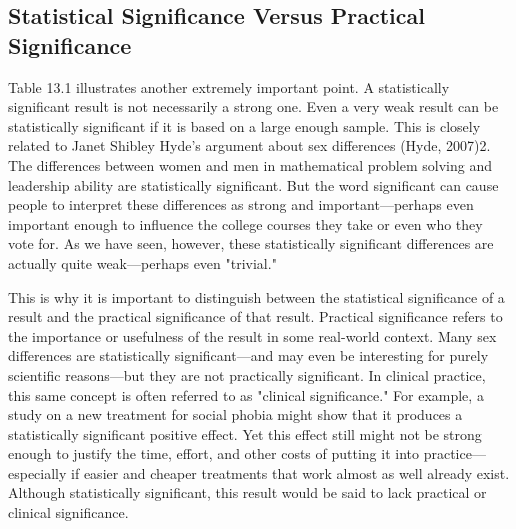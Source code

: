 \subsection{Statistical Significance Versus Practical Significance}


Table 13.1 illustrates another extremely important point. A statistically significant result is not necessarily a strong one. Even a very weak result can be statistically significant if it is based on a large enough sample. This is closely related to Janet Shibley Hyde's argument about sex differences (Hyde, 2007)2. The differences between women and men in mathematical problem solving and leadership ability are statistically significant. But the word significant can cause people to interpret these differences as strong and important---perhaps even important enough to influence the college courses they take or even who they vote for. As we have seen, however, these statistically significant differences are actually quite weak---perhaps even "trivial."


This is why it is important to distinguish between the statistical significance of a result and the practical significance of that result. Practical significance refers to the importance or usefulness of the result in some real-world context. Many sex differences are statistically significant---and may even be interesting for purely scientific reasons---but they are not practically significant. In clinical practice, this same concept is often referred to as "clinical significance." For example, a study on a new treatment for social phobia might show that it produces a statistically significant positive effect. Yet this effect still might not be strong enough to justify the time, effort, and other costs of putting it into practice---especially if easier and cheaper treatments that work almost as well already exist. Although statistically significant, this result would be said to lack practical or clinical significance.


